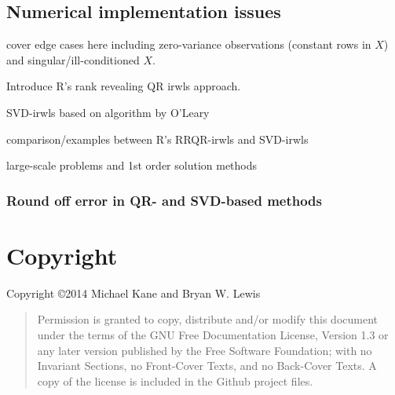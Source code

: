 \documentclass[10pt]{article} %
\begin{document}
\subsection*{Numerical implementation issues}

cover edge cases here including zero-variance observations (constant rows in $X$)
and singular/ill-conditioned $X$.

Introduce R's rank revealing QR irwls approach.

SVD-irwls based on algorithm by O'Leary

comparison/examples between R's RRQR-irwls and SVD-irwls

large-scale problems and 1st order solution methods


\subsubsection*{Round off error in QR- and SVD-based methods}











\section*{Copyright}
Copyright \copyright  2014 Michael Kane and Bryan W. Lewis

\begin{quote}
    Permission is granted to copy, distribute and/or modify this document
    under the terms of the GNU Free Documentation License, Version 1.3
    or any later version published by the Free Software Foundation;
    with no Invariant Sections, no Front-Cover Texts, and no Back-Cover Texts.
    A copy of the license is included in the Github project files.
\end{quote}
\end{document}
